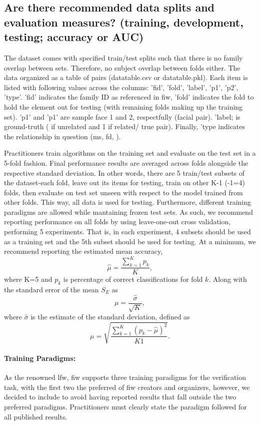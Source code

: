 \subsection*{Are there recommended data splits and evaluation measures? (\eg training, development, testing; accuracy or AUC)}
\noindent The dataset comes with specified train/test splits such that there is no family overlap between sets. Therefore, no subject overlap between folds either. The data organized as a table of pairs (datatable.csv or datatable.pkl). Each item is listed with following values across the columns: 'fid', 'fold', 'label', 'p1', 'p2', 'type'. 'fid' indicates the family ID as referenced in \gls{fiw}, 'fold' indicates the fold to hold the element out for testing (\ie with remaining folds making up the training set). 'p1' and 'p1' are sample face 1 and 2, respectfully (\ie facial pair). 'label; is ground-truth ( if unrelated and 1 if related/ true pair). Finally, 'type indicates the relationship in question (\eg \gls{ms}, \gls{fd}, \etc).

Practitioners train algorithms on the training set and evaluate on the test set in a 5-fold fashion. Final
performance results are averaged across folds alongside the respective standard deviation.
In other words, there are 5 train/test subsets of the dataset-each fold, leave out its items for testing, train on other K-1 (-1=4) folds, then evaluate on test set unseen with respect to the model trained from other folds. This way, all data is used for testing. Furthermore, different training paradigms are allowed while mantaining frozen test sets. As such, we recommend reporting performance on all folds by using leave-one-out cross validation, performing 5 experiments. That is, in each experiment, 4 subsets should be used as a training set and the 5th subset should be used for testing. At a minimum, we recommend reporting the estimated mean accuracy, $$\hat\mu=\frac{\sum^K_{k=1}p_k}{K},$$ where K=5 and $p_k$ is percentage of correct classifications for fold $k$. Along with the standard error of the mean $S_E$ as
$$
\mu=\frac{\hat\sigma}{\sqrt{K}},
$$
where $\hat\sigma$ is the estimate of the standard deviation, defined as
$$
\mu=\sqrt{\frac{\sum^K_{k=1}(p_k-\hat\mu)^2}{K 1}}.$$

\paragraph{Training Paradigms:} As the renowned \gls{lfw}, \gls{fiw} supports three training paradigms for the verification task, with the first two the preferred of \gls{fiw} creators and organizers, however, we decided to include to avoid having reported results that fall outside the two preferred paradigms. Practitioners must clearly state the paradigm followed for all published results.

